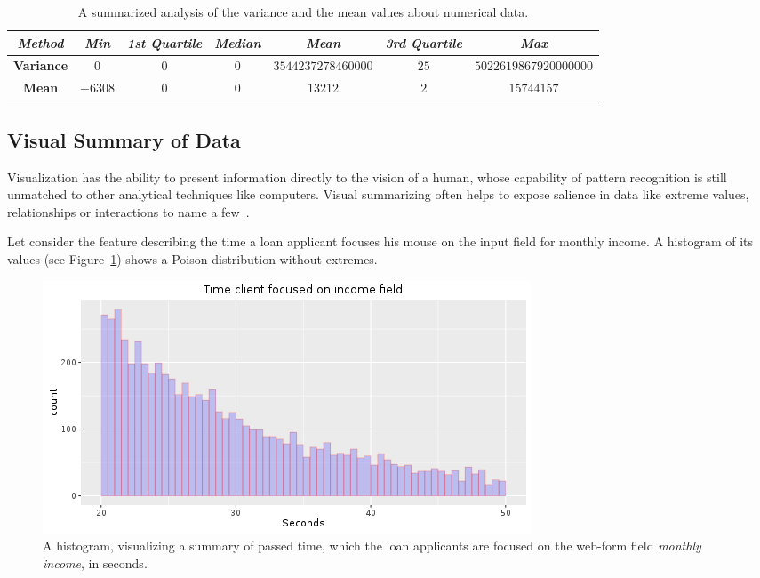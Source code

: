 \begin{table}[h!]
  \begin{center}
    \caption{A summarized analysis of the variance and the mean values about numerical data.}
    \label{tab:summarized-analysis}
    \hspace*{-2cm}\begin{tabular}{|c|c|c|c|c|c|c|}  \hline
    \textit{Method} & \textit{Min} & \textit{1st Quartile} & \textit{Median} & \textit{Mean} & \textit{3rd Quartile} & \textit{Max}  \\
      \hline
    \textbf{Variance} & \(0\) & \(0\) & \(0\) & \(3544237278460000\) & \(25\) & \(5022619867920000000\) \\
     \hline
     \textbf{Mean} & \(-6308\) & \(0\) & \(0\) & \(13212\) & \(2\) & \(15744157\) \\
    \hline 
    \end{tabular}
  \end{center}
\end{table}



\subsection{Visual Summary of Data}\label{Ch:2:VSummary} 
Visualization has the ability to present information directly to the vision of a human, whose capability of pattern recognition is still unmatched to other analytical techniques like computers. Visual summarizing often helps to expose salience in data like extreme values, relationships or interactions to name a few~\cite{993180}. 

Let consider the feature describing the time a loan applicant focuses his mouse on the input field for monthly income.  A histogram of its values (see Figure~\ref{fig:time-focused}) shows a Poison distribution without extremes. 
\begin{figure}[h!]
    \centering
    \includegraphics[scale=0.7]{Graphics/time_client_on_income.png}
    \caption{A histogram, visualizing a summary of passed time, which the loan applicants are focused on the web-form field \textit{monthly income}, in seconds.}
    \label{fig:time-focused}
\end{figure}


